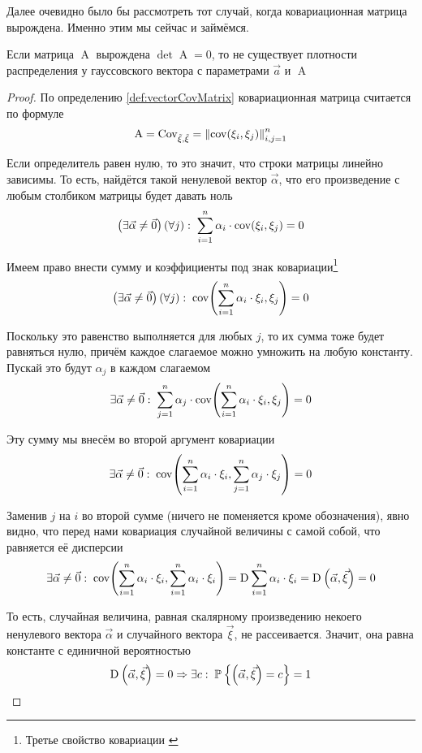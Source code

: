 Далее очевидно было бы рассмотреть тот случай, когда ковариационная матрица
вырождена. Именно этим мы сейчас и займёмся.

\begin{affirmation}
  Если матрица $\operatorname{A}$ вырождена $\det\operatorname{A} = 0$, то не
  существует плотности распределения у гауссовского вектора с параметрами
  $\vec{a}$ и $\operatorname{A}$
\end{affirmation}
\begin{proof}
  По определению \ref{def:vectorCovMatrix} ковариационная матрица считается по
  формуле
  $$\operatorname{A}
      = \operatorname{Cov^{}_{\vec{\xi}, \vec{\xi}}}
      = \left\| \operatorname{cov}\!\left( \xi_i, \xi_j \right) \right\|_{i,j=1}^n$$

  Если определитель равен нулю, то это значит, что строки матрицы линейно
  зависимы. То есть, найдётся такой ненулевой вектор $\vec{\alpha}$, что
  его произведение с любым столбиком матрицы будет давать ноль
  $$\left( \exists \vec{\alpha} \neq \vec{0} \right) \left( \forall j \right):
      \;\sum_{i=1}^{n} \alpha_i \cdot \operatorname{cov}\!\left( \xi_i, \xi_j \right) = 0$$

  Имеем право внести сумму и коэффициенты под знак ковариации\footnote{Третье
  свойство ковариации \cite[с.~310]{MGTUXVI}}
  $$\left( \exists \vec{\alpha} \neq \vec{0} \right) \left( \forall j \right):
      \;\operatorname{cov}\!\left( \sum_{i=1}^{n} \alpha_i \cdot \xi_i, \xi_j \right) = 0$$

  Поскольку это равенство выполняется для любых $j$, то их сумма тоже будет
  равняться нулю, причём каждое слагаемое можно умножить на любую константу.
  Пускай это будут $\alpha_j$ в каждом слагаемом
  $$\exists \vec{\alpha} \neq \vec{0}:\; \sum_{j=1}^{n} \alpha_j
      \cdot \operatorname{cov}\!\left( \sum_{i=1}^{n} \alpha_i \cdot \xi_i, \xi_j \right) = 0$$

  Эту сумму мы внесём во второй аргумент ковариации
  $$\exists \vec{\alpha} \neq \vec{0}:\;
      \operatorname{cov}\!\left( \sum_{i=1}^{n} \alpha_i \cdot \xi_i,
      \sum_{j=1}^{n} \alpha_j \cdot \xi_j \right) = 0$$

  Заменив $j$ на $i$ во второй сумме (ничего не поменяется кроме обозначения),
  явно видно, что перед нами ковариация случайной величины с самой собой, что
  равняется её дисперсии
  $$\exists \vec{\alpha} \neq \vec{0}:\;
      \operatorname{cov}\!\left( \sum_{i=1}^{n} \alpha_i \cdot \xi_i,
      \sum_{i=1}^{n} \alpha_i \cdot \xi_i \right)
      = \operatorname{D}_{} \sum_{i=1}^{n} \alpha_i \cdot \xi_i
      = \operatorname{D}_{} \left( \vec{\alpha}, \vec{\xi} \right)
      = 0$$

  То есть, случайная величина, равная скалярному произведению некоего
  ненулевого вектора $\vec{\alpha}$ и случайного вектора $\vec{\xi}$,
  не рассеивается. Значит, она равна константе с единичной вероятностью
  $$\operatorname{D}_{} \left( \vec{\alpha}, \vec{\xi} \right) = 0
      \Rightarrow \exists c:\;
      \mathbb{P}_{{}}\left\{ \left( \vec{\alpha}, \vec{\xi} \right) = c \right\} = 1$$


\end{proof}
